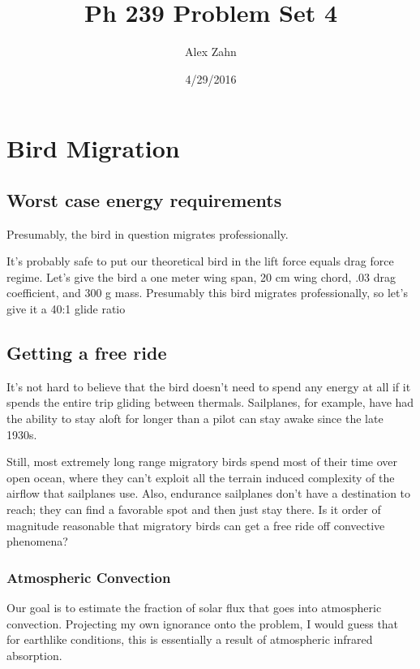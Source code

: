 \documentclass[12pt]{article}
\title{Ph 239 Problem Set 4}
\author{Alex Zahn}
\date{4/29/2016}
\begin{document}
\maketitle

\newcommand{\wmsq}{W/\(\mathrm{m}^2\,\)}
\newcommand{\msq}{\(\mathrm{m}^2\,\)}
\newcommand{\micron}{\(\mu\mathrm{m}\)\,}
\newcommand{\mcb}{\(\mathrm{m}^3\,\)}

\section{Bird Migration}

\subsection{Worst case energy requirements}

Presumably, the bird in question migrates professionally. 

It's probably safe to put our theoretical bird in the lift force equals drag force regime. Let's give the bird a one meter wing span, 20 cm wing chord, .03 drag coefficient, and 300 g mass. Presumably this bird migrates professionally, so let's give it a 40:1 glide ratio

\subsection{Getting a free ride}

It's not hard to believe that the bird doesn't need to spend any energy at all if it spends the entire trip gliding between thermals. Sailplanes, for example, have had the ability to stay aloft for longer than a pilot can stay awake since the late 1930s.

Still, most extremely long range migratory birds spend most of their time over open ocean, where they can't exploit all the terrain induced complexity of the airflow that sailplanes use. Also, endurance sailplanes don't have a destination to reach; they can find a favorable spot and then just stay there. Is it order of magnitude reasonable that migratory birds can get a free ride off convective phenomena?

\subsubsection{Atmospheric Convection}

Our goal is to estimate the fraction of solar flux that goes into atmospheric convection. Projecting my own ignorance onto the problem, I would guess that for earthlike conditions, this is essentially a result of atmospheric infrared absorption.
\end{document}
